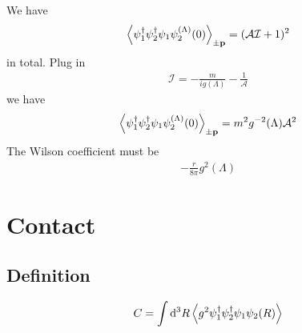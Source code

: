 \documentclass{article}
\newcommand{\calA}{\mathcal{A}}
\begin{document}
We have
\begin{align}
	\expval{\psi^\dagger_1\psi^\dagger_2\psi_1\psi_2^{(\Lambda)}(0)}_{\pm\vb{p}}=(\calA\mathcal{I}+1)^2
\end{align}
in total. Plug in
\begin{align}
	\mathcal{I}=-\frac{m}{ig(\Lambda)}-\frac{1}{\calA}
\end{align}
we have
\begin{align}
	\expval{\psi^\dagger_1\psi^\dagger_2\psi_1\psi_2^{(\Lambda)}(0)}_{\pm\vb{p}}=m^2g^{-2}(\Lambda)\calA^2
	\label{2c}
\end{align}
The Wilson coefficient must be
\begin{align}
	-\frac{r}{8\pi}g^2(\Lambda)
\end{align}

\section{Contact}
\subsection{Definition}
\begin{align}
	C=\int\dd^3R\expval{g^2\psi^\dagger_1\psi^\dagger_2\psi_1\psi_2(R)}
	\label{contact}
\end{align}
\end{document}
